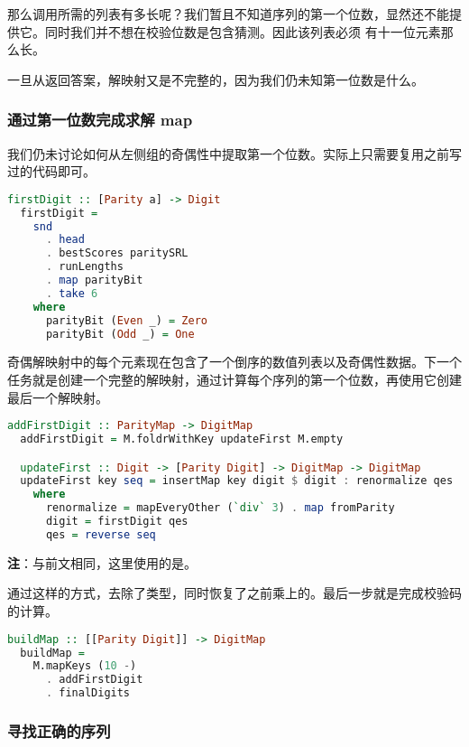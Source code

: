 \documentclass[./main.tex]{subfiles}
\begin{document}
那么调用所需的列表有多长呢？我们暂且不知道序列的第一个位数，显然还不能提供它。同时我们并不想在校验位数是包含猜测。因此该列表必须
有十一位元素那么长。

一旦从返回答案，解映射又是不完整的，因为我们仍未知第一位数是什么。

\subsubsection*{通过第一位数完成求解 map}

我们仍未讨论如何从左侧组的奇偶性中提取第一个位数。实际上只需要复用之前写过的代码即可。

\begin{lstlisting}[language=Haskell]
  firstDigit :: [Parity a] -> Digit
  firstDigit =
    snd
      . head
      . bestScores paritySRL
      . runLengths
      . map parityBit
      . take 6
    where
      parityBit (Even _) = Zero
      parityBit (Odd _) = One
\end{lstlisting}

奇偶解映射中的每个元素现在包含了一个倒序的数值列表以及奇偶性数据。下一个任务就是创建一个完整的解映射，通过计算每个序列的第一个位数，再使用它创建最后一个解映射。

\begin{lstlisting}[language=Haskell]
  addFirstDigit :: ParityMap -> DigitMap
  addFirstDigit = M.foldrWithKey updateFirst M.empty

  updateFirst :: Digit -> [Parity Digit] -> DigitMap -> DigitMap
  updateFirst key seq = insertMap key digit $ digit : renormalize qes
    where
      renormalize = mapEveryOther (`div` 3) . map fromParity
      digit = firstDigit qes
      qes = reverse seq
\end{lstlisting}

\textbf{注}：与前文相同，这里使用的是。

通过这样的方式，去除了类型，同时恢复了之前乘上的。最后一步就是完成校验码的计算。

\begin{lstlisting}[language=Haskell]
  buildMap :: [[Parity Digit]] -> DigitMap
  buildMap =
    M.mapKeys (10 -)
      . addFirstDigit
      . finalDigits
\end{lstlisting}

\subsubsection*{寻找正确的序列}
\end{document}
